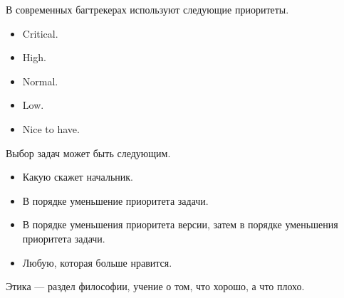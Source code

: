     \begin{Rem}
        В современных багтрекерах используют следующие приоритеты.
        \begin{itemize}
            \item Critical.
            \item High.
            \item Normal.
            \item Low.
            \item Nice to have.
        \end{itemize}
    \end{Rem}

    \begin{Rem}
        Выбор задач может быть следующим.
        \begin{itemize}
            \item Какую скажет начальник.
            \item В порядке уменьшение приоритета задачи.
            \item В порядке уменьшения приоритета версии, затем в порядке уменьшения приоритета задачи.
            \item Любую, которая больше нравится.
        \end{itemize}
    \end{Rem}


    
    \begin{Def}[Этика]
        Этика --- раздел философии, учение о том, что хорошо, а что плохо.
    \end{Def}
    
